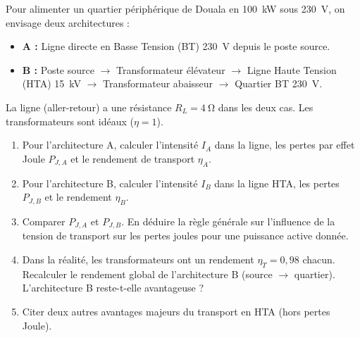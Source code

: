 \documentclass[11pt]{article}
\begin{document}
\begin{exercice}
Pour alimenter un quartier périphérique de Douala en \SI{100}{\kilo\watt} sous \SI{230}{\volt}, on envisage deux architectures :
\begin{itemize}
    \item \textbf{A :} Ligne directe en Basse Tension (BT) \SI{230}{\volt} depuis le poste source.
    \item \textbf{B :} Poste source $\rightarrow$ Transformateur élévateur $\rightarrow$ Ligne Haute Tension (HTA) \SI{15}{\kilo\volt} $\rightarrow$ Transformateur abaisseur $\rightarrow$ Quartier BT \SI{230}{\volt}.
\end{itemize}
La ligne (aller-retour) a une résistance $R_L = \SI{4}{\ohm}$ dans les deux cas. Les transformateurs sont idéaux ($\eta = 1$).
\begin{enumerate}
    \item Pour l'architecture A, calculer l'intensité $I_A$ dans la ligne, les pertes par effet Joule $P_{J,A}$ et le rendement de transport $\eta_A$.
    \item Pour l'architecture B, calculer l'intensité $I_B$ dans la ligne HTA, les pertes $P_{J,B}$ et le rendement $\eta_B$.
    \item Comparer $P_{J,A}$ et $P_{J,B}$. En déduire la règle générale sur l'influence de la tension de transport sur les pertes joules pour une puissance active donnée.
    \item Dans la réalité, les transformateurs ont un rendement $\eta_T = 0,98$ chacun. Recalculer le rendement global de l'architecture B (source $\rightarrow$ quartier). L'architecture B reste-t-elle avantageuse ?
    \item Citer deux autres avantages majeurs du transport en HTA (hors pertes Joule).
\end{enumerate}
\end{exercice}
\end{document}

